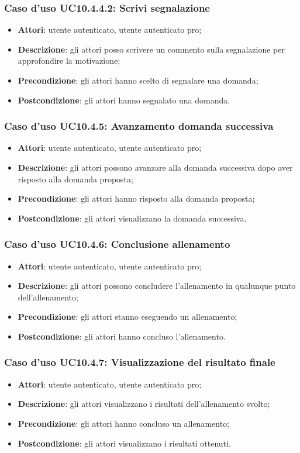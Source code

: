 \subsubsection{Caso d'uso UC10.4.4.2: Scrivi segnalazione}
	\begin{itemize}
		\item \textbf{Attori}: utente autenticato, utente autenticato pro;
		\item \textbf{Descrizione}: gli attori posso scrivere un commento sulla segnalazione per approfondire la motivazione;
		\item \textbf{Precondizione}: gli attori hanno scelto di segnalare una domanda;
		\item \textbf{Postcondizione}: gli attori hanno segnalato una domanda.
	\end{itemize}
\subsubsection{Caso d'uso UC10.4.5: Avanzamento domanda successiva}
	\begin{itemize}
		\item \textbf{Attori}: utente autenticato, utente autenticato pro;
		\item \textbf{Descrizione}: gli attori possono avanzare alla domanda successiva dopo aver risposto alla domanda proposta; 
		\item \textbf{Precondizione}: gli attori hanno risposto alla domanda proposta;
		\item \textbf{Postcondizione}: gli attori visualizzano la domanda successiva.
	\end{itemize}
\subsubsection{Caso d'uso UC10.4.6: Conclusione allenamento}
	\begin{itemize}
		\item \textbf{Attori}: utente autenticato, utente autenticato pro;
		\item \textbf{Descrizione}: gli attori possono concludere l'allenamento in qualunque punto dell'allenamento;
		\item \textbf{Precondizione}: gli attori stanno eseguendo un allenamento;
		\item \textbf{Postcondizione}: gli attori hanno concluso l'allenamento.
	\end{itemize}
\subsubsection{Caso d'uso UC10.4.7: Visualizzazione del risultato finale}
	\begin{itemize}
		\item \textbf{Attori}: utente autenticato, utente autenticato pro;
		\item \textbf{Descrizione}: gli attori visualizzano i risultati dell'allenamento svolto;
		\item \textbf{Precondizione}: gli attori hanno concluso un allenamento;
		\item \textbf{Postcondizione}: gli attori visualizzano i risultati ottenuti.
	\end{itemize}